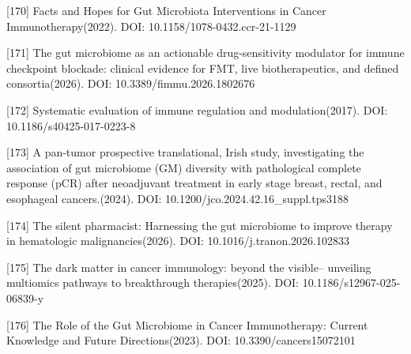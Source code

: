 {[}170{]} Facts and Hopes for Gut Microbiota Interventions in Cancer Immunotherapy(2022). DOI: 10.1158/1078-0432.ccr-21-1129

{[}171{]} The gut microbiome as an actionable drug-sensitivity modulator for immune checkpoint blockade: clinical evidence for FMT, live biotherapeutics, and defined consortia(2026). DOI: 10.3389/fimmu.2026.1802676

{[}172{]} Systematic evaluation of immune regulation and modulation(2017). DOI: 10.1186/s40425-017-0223-8

{[}173{]} A pan-tumor prospective translational, Irish study, investigating the association of gut microbiome (GM) diversity with pathological complete response (pCR) after neoadjuvant treatment in early stage breast, rectal, and esophageal cancers.(2024). DOI: 10.1200/jco.2024.42.16\_suppl.tps3188

{[}174{]} The silent pharmacist: Harnessing the gut microbiome to improve therapy in hematologic malignancies(2026). DOI: 10.1016/j.tranon.2026.102833

{[}175{]} The dark matter in cancer immunology: beyond the visible-- unveiling multiomics pathways to breakthrough therapies(2025). DOI: 10.1186/s12967-025-06839-y

{[}176{]} The Role of the Gut Microbiome in Cancer Immunotherapy: Current Knowledge and Future Directions(2023). DOI: 10.3390/cancers15072101
